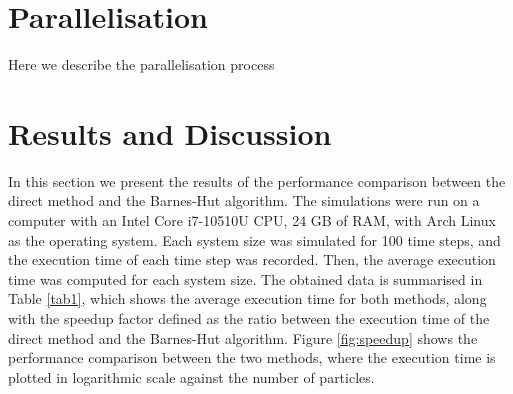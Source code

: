 \documentclass[runningheads]{llncs}
\begin{document}

\section{Parallelisation}
Here we describe the parallelisation process

\section{Results and Discussion}
In this section we present the results of the performance comparison between the direct method and the Barnes-Hut algorithm. The simulations were run on a computer with an Intel Core i7-10510U CPU, 24 GB of RAM, with Arch Linux as the operating system. Each system size was simulated for 100 time steps, and the execution time of each time step was recorded. Then, the average execution time was computed for each system size. The obtained data is summarised in Table \ref{tab1}, which shows the average execution time for both methods, along with the speedup factor defined as the ratio between the execution time of the direct method and the Barnes-Hut algorithm. Figure \ref{fig:speedup} shows the performance comparison between the two methods, where the execution time is plotted in logarithmic scale against the number of particles.
\end{document}
